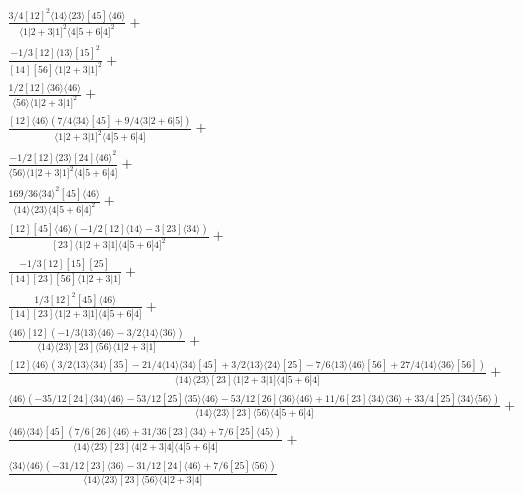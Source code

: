\documentclass[varwidth, border=5pt]{standalone}
\begin{document}
\begin{my}
$\begin{gathered}
\scriptscriptstyle\frac{3/4[12]^2⟨14⟩⟨23⟩[45]⟨46⟩}{⟨1|2+3|1]^2⟨4|5+6|4]^2}+\\
\scriptscriptstyle\frac{-1/3[12]⟨13⟩[15]^2}{[14][56]⟨1|2+3|1]^2}+\\
\scriptscriptstyle\frac{1/2[12]⟨36⟩⟨46⟩}{⟨56⟩⟨1|2+3|1]^2}+\\
\scriptscriptstyle\frac{[12]⟨46⟩(7/4⟨34⟩[45]+9/4⟨3|2+6|5])}{⟨1|2+3|1]^2⟨4|5+6|4]}+\\
\scriptscriptstyle\frac{-1/2[12]⟨23⟩[24]⟨46⟩^2}{⟨56⟩⟨1|2+3|1]^2⟨4|5+6|4]}+\\
\scriptscriptstyle\frac{169/36⟨34⟩^2[45]⟨46⟩}{⟨14⟩⟨23⟩⟨4|5+6|4]^2}+\\
\scriptscriptstyle\frac{[12][45]⟨46⟩(-1/2[12]⟨14⟩-3[23]⟨34⟩)}{[23]⟨1|2+3|1]⟨4|5+6|4]^2}+\\
\scriptscriptstyle\frac{-1/3[12][15][25]}{[14][23][56]⟨1|2+3|1]}+\\
\scriptscriptstyle\frac{1/3[12]^2[45]⟨46⟩}{[14][23]⟨1|2+3|1]⟨4|5+6|4]}+\\
\scriptscriptstyle\frac{⟨46⟩[12](-1/3⟨13⟩⟨46⟩-3/2⟨14⟩⟨36⟩)}{⟨14⟩⟨23⟩[23]⟨56⟩⟨1|2+3|1]}+\\
\scriptscriptstyle\frac{[12]⟨46⟩(3/2⟨13⟩⟨34⟩[35]-21/4⟨14⟩⟨34⟩[45]+3/2⟨13⟩⟨24⟩[25]-7/6⟨13⟩⟨46⟩[56]+27/4⟨14⟩⟨36⟩[56])}{⟨14⟩⟨23⟩[23]⟨1|2+3|1]⟨4|5+6|4]}+\\
\scriptscriptstyle\frac{⟨46⟩(-35/12[24]⟨34⟩⟨46⟩-53/12[25]⟨35⟩⟨46⟩-53/12[26]⟨36⟩⟨46⟩+11/6[23]⟨34⟩⟨36⟩+33/4[25]⟨34⟩⟨56⟩)}{⟨14⟩⟨23⟩[23]⟨56⟩⟨4|5+6|4]}+\\
\scriptscriptstyle\frac{⟨46⟩⟨34⟩[45](7/6[26]⟨46⟩+31/36[23]⟨34⟩+7/6[25]⟨45⟩)}{⟨14⟩⟨23⟩[23]⟨4|2+3|4]⟨4|5+6|4]}+\\
\scriptscriptstyle\frac{⟨34⟩⟨46⟩(-31/12[23]⟨36⟩-31/12[24]⟨46⟩+7/6[25]⟨56⟩)}{⟨14⟩⟨23⟩[23]⟨56⟩⟨4|2+3|4]}\phantom{+}
\end{gathered}$
\end{my}
\end{document}
